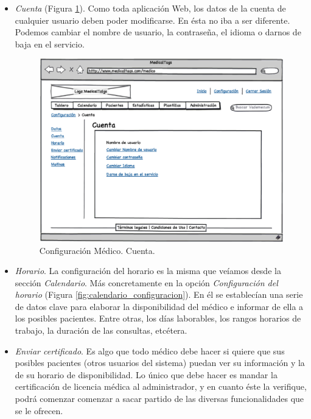 \documentclass[a4paper,oneside,11pt]{book}
\begin{document}
\begin{itemize}
			\item \textit{Cuenta} (Figura \ref{fig:configuracion_cuenta}). Como toda aplicación Web, los datos de la cuenta de cualquier usuario deben poder modificarse. En ésta no iba a ser diferente. Podemos cambiar el nombre de usuario, la contraseña, el idioma o darnos de baja en el servicio.
			
			\begin{figure}[H]
			  \centering
			    \includegraphics[width=12cm]{img/eps/24_Configuracion_Medico2.eps}
			  \caption{Configuración Médico. Cuenta.}
			  \label{fig:configuracion_cuenta}
			\end{figure}
			
			\item \textit{Horario}. La configuración del horario es la misma que veíamos desde la sección \textit{Calendario}. Más concretamente en la opción \textit{Configuración del horario} (Figura \ref{fig:calendario_configuracion}). En él se establecían una serie de datos clave para elaborar la disponibilidad del médico e informar de ella a los posibles pacientes. Entre otras, los días laborables, los rangos horarios de trabajo, la duración de las consultas, etcétera.
			
			\item \textit{Enviar certificado}. Es algo que todo médico debe hacer si quiere que sus posibles pacientes (otros usuarios del sistema) puedan ver su información y la de su horario de disponibilidad. Lo único que debe hacer es mandar la certificación de licencia médica al administrador, y en cuanto éste la verifique, podrá comenzar comenzar a sacar partido de las diversas funcionalidades que se le ofrecen.
			

\end{itemize}
\end{document}
